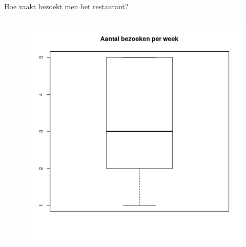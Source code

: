 \documentclass[aspectratio=169]{beamer}
\begin{document}
\begin{frame}{Hoe vaakt bezoekt men het restaurant?}
\begin{columns}
    \begin{column}{0.5\textwidth}
      \begin{figure}
        \centering
        \includegraphics[height=.8\textheight]{img/2var-boxplot-aantalbezoeken}
        \label{fig:boxplotStudenten2}
      \end{figure}
    \end{column}
  
  \end{columns}
\end{frame}
\end{document}
